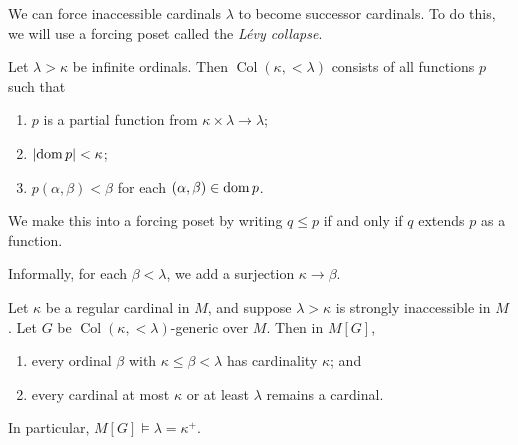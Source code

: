 We can force inaccessible cardinals \( \lambda \) to become successor cardinals.
To do this, we will use a forcing poset called the \emph{L\'evy collapse}.
\begin{definition}
    Let \( \lambda > \kappa \) be infinite ordinals.
    Then \( \operatorname{Col}(\kappa,<\lambda) \) consists of all functions \( p \) such that
    \begin{enumerate}
        \item \( p \) is a partial function from \( \kappa \times \lambda \to \lambda \);
        \item \( \abs{\operatorname{dom} p} < \kappa \);
        \item \( p(\alpha, \beta) < \beta \) for each \( (\alpha, \beta) \in \operatorname{dom} p \).
    \end{enumerate}
    We make this into a forcing poset by writing \( q \leq p \) if and only if \( q \) extends \( p \) as a function.
\end{definition}
Informally, for each \( \beta < \lambda \), we add a surjection \( \kappa \to \beta \).
\begin{theorem}[L\'evy]
    Let \( \kappa \) be a regular cardinal in \( M \), and suppose \( \lambda > \kappa \) is strongly inaccessible in \( M \).
    Let \( G \) be \( \operatorname{Col}(\kappa, <\lambda) \)-generic over \( M \).
    Then in \( M[G] \),
    \begin{enumerate}
        \item every ordinal \( \beta \) with \( \kappa \leq \beta < \lambda \) has cardinality \( \kappa \); and
        \item every cardinal at most \( \kappa \) or at least \( \lambda \) remains a cardinal.
    \end{enumerate}
    In particular, \( M[G] \vDash \lambda = \kappa^+ \).
\end{theorem}
